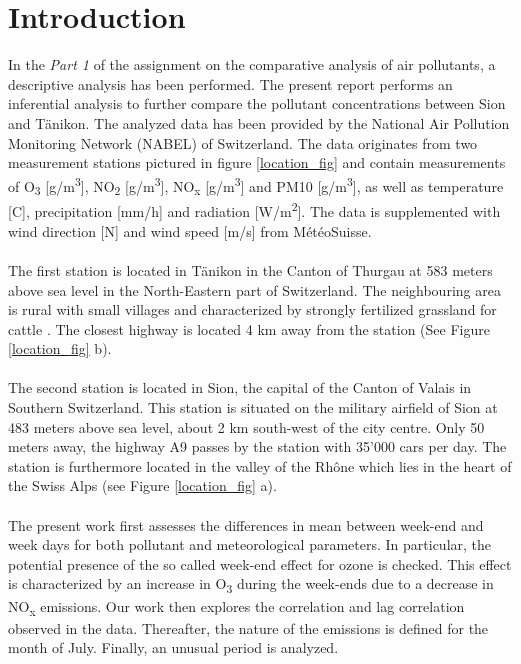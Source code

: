 \documentclass[a4paper, 12pt]{article}
\begin{document}

\newpage
\tableofcontents
{}
\newpage
{}
\setcounter{page}{1}


\section{Introduction}
    
    In the \textit{Part 1} of the assignment on the comparative analysis of air pollutants, a descriptive analysis has been performed. The present report performs an inferential analysis to further compare the pollutant concentrations between Sion and Tänikon. The analyzed data has been provided by the National Air Pollution Monitoring Network (NABEL) of Switzerland. The data originates from two measurement stations pictured in figure \ref{location_fig} and contain measurements of O\textsubscript{3} [\textmu g/m\textsuperscript{3}], NO\textsubscript{2} [\textmu g/m\textsuperscript{3}], NO\textsubscript{x} [\textmu g/m\textsuperscript{3}] and PM10 [\textmu g/m\textsuperscript{3}], as well as temperature [\degree C], precipitation [mm/h] and radiation [W/m\textsuperscript{2}]. The data is supplemented with wind direction [\degree N] and wind speed [m/s] from MétéoSuisse. 
    \\
    \\
    The first station is located in Tänikon in the Canton of Thurgau at 583 meters above sea level in the North-Eastern part of Switzerland. The neighbouring area is rural with small villages and characterized by strongly fertilized grassland for cattle . The closest highway is located 4 km away from the station (See Figure \ref{location_fig} b).  \\
    \\
    The second station is located in Sion, the capital of the Canton of Valais in Southern Switzerland. This station is situated on the military airfield of Sion at 483 meters above sea level, about 2 km south-west of the city centre. Only 50 meters away, the highway A9 passes by the station with 35’000 cars per day. The station is furthermore located in the valley of the Rhône which lies in the heart of the Swiss Alps (see Figure \ref{location_fig} a). 
    \\
    \\
    The present work first assesses the differences in mean between week-end and week days for both pollutant and meteorological parameters. In particular, the potential presence of the so called week-end effect for ozone is checked. This effect is characterized by an increase in O\textsubscript{3} during the week-ends due to a decrease in NO\textsubscript{x} emissions. Our work then explores the correlation and lag correlation observed in the data. Thereafter, the nature of the emissions is defined for the month of July. Finally, an unusual period is analyzed.
    
\end{document}
